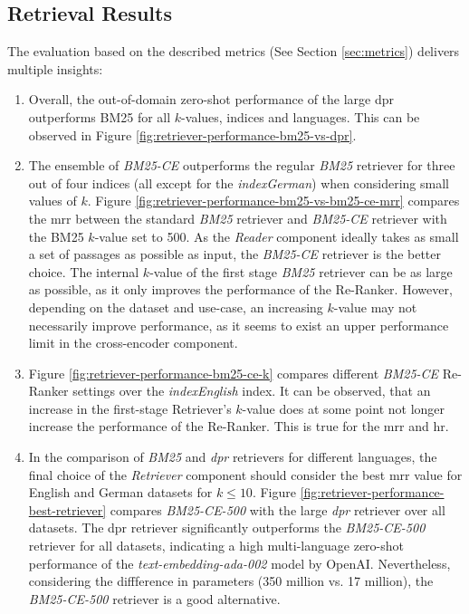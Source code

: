 \subsection{Retrieval Results}
\label{subsec:retrieval-results}

The evaluation based on the described metrics (See Section \ref{sec:metrics}) delivers multiple insights:


\begin{enumerate}
    \item Overall, the out-of-domain zero-shot performance of the large \gls{dpr} outperforms BM25 for all $k$-values, indices and languages. This can be observed in Figure \ref{fig:retriever-performance-bm25-vs-dpr}.
    \item The ensemble of \textit{BM25-CE} outperforms the regular \textit{BM25} retriever for three out of four indices (all except for the \textit{indexGerman}) when considering small values of $k$. Figure \ref{fig:retriever-performance-bm25-vs-bm25-ce-mrr} compares the \gls{mrr} between the standard \textit{BM25} retriever and \textit{BM25-CE} retriever with the BM25 $k$-value set to 500. As the \textit{Reader} component ideally takes as small a set of passages as possible as input, the \textit{BM25-CE} retriever is the better choice. The internal $k$-value of the first stage \textit{BM25} retriever can be as large as possible, as it only improves the performance of the Re-Ranker. However, depending on the dataset and use-case, an increasing $k$-value may not necessarily improve performance, as it seems to exist an upper performance limit in the cross-encoder component.
    \item Figure \ref{fig:retriever-performance-bm25-ce-k} compares different \textit{BM25-CE} Re-Ranker settings over the \textit{indexEnglish} index. It can be observed, that an increase in the first-stage Retriever's $k$-value does at some point not longer increase the performance of the Re-Ranker. This is true for the \gls{mrr} and \gls{hr}.
    
    \item In the comparison of \textit{BM25} and \textit{\gls{dpr}} retrievers for different languages, the final choice of the \textit{Retriever} component should consider the best \gls{mrr} value for English and German datasets for $k \leq 10$. Figure \ref{fig:retriever-performance-best-retriever} compares \textit{BM25-CE-500} with the large \textit{\gls{dpr}} retriever over all datasets. The \gls{dpr} retriever significantly outperforms the \textit{BM25-CE-500} retriever for all datasets, indicating a high multi-language zero-shot performance of the \textit{text-embedding-ada-002} model by OpenAI. Nevertheless, considering the diffference in parameters (350 million vs. 17 million), the \textit{BM25-CE-500} retriever is a good alternative.
\end{enumerate}

